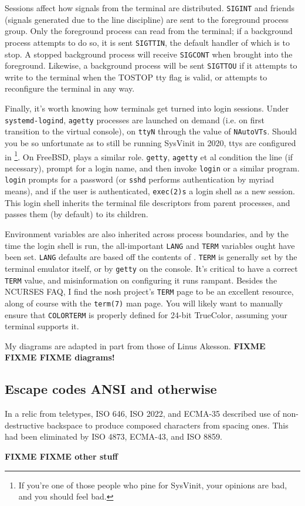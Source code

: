 Sessions affect how signals from the terminal are distributed. \texttt{SIGINT}
and friends (signals generated due to the line discipline) are sent to the
foreground process group. Only the foreground process can read from the
terminal; if a background process attempts to do so, it is sent \texttt{SIGTTIN}, the default
handler of which is to stop. A stopped background process will receive
\texttt{SIGCONT} when brought into the foreground. Likewise, a background
process will be sent \texttt{SIGTTOU} if it attempts to write to the terminal
when the TOSTOP tty flag is valid, or attempts to reconfigure the terminal in
any way\cite{sigterminals}.

Finally, it's worth knowing how terminals get turned into login sessions. Under
\texttt{systemd-logind}\cite{logind}, \texttt{agetty} processes are launched
on demand (i.e. on first transition to the virtual console), on \texttt{ttyN}
through the value of \texttt{NAutoVTs}. Should you be so unfortunate as to
still be running SysVinit in 2020, ttys are configured in \footnote{If you're one of those people who pine for SysVinit, your opinions are bad, and you should feel bad.}.
On FreeBSD,  plays a similar role\cite{fbsdttys5}. \texttt{getty},
\texttt{agetty} et al condition the line (if necessary), prompt for a login
name, and then invoke \texttt{login} or a similar program. \texttt{login} prompts
for a password (or \texttt{sshd} performs authentication by myriad means), and
if the user is authenticated, \texttt{exec(2)s} a login shell as a new session.
This login shell inherits the terminal file descriptors from parent processes,
and passes them (by default) to its children.

Environment variables are also inherited across process boundaries, and by the
time the login shell is run, the all-important \texttt{LANG} and \texttt{TERM}
variables ought have been set. \texttt{LANG} defaults are based off the contents
of . \texttt{TERM} is generally set by the terminal emulator itself,
or by \texttt{getty} on the console. It's critical to have a correct \texttt{TERM}
value, and misinformation on configuring it runs rampant. Besides the NCURSES FAQ\cite{ncursesfaq},
I find the nosh project's \texttt{TERM} page\cite{noshterm} to be an excellent
resource, along of course with the \texttt{term(7)} man page\cite{term7}. You
will likely want to manually ensure that \texttt{COLORTERM} is properly defined
for 24-bit TrueColor, assuming your terminal supports it.

My diagrams are adapted in part from those of Linus Akesson\cite{ttydemystified}.
\textbf{FIXME FIXME FIXME diagrams!}

\subsection{Escape codes ANSI and otherwise}
\label{sec:escapes}

In a relic from teletypes, ISO 646, ISO 2022, and ECMA-35 described use of
non-destructive backspace to produce composed characters from spacing ones.
This had been eliminated by ISO 4873, ECMA-43, and ISO 8859.

\textbf{FIXME FIXME other stuff}

